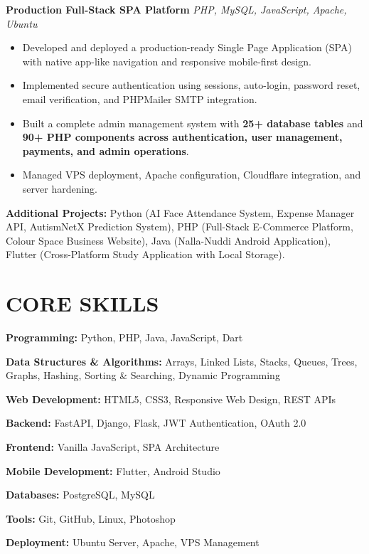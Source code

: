 \documentclass[10pt,a4paper]{article}
\begin{document}
\textbf{Production Full-Stack SPA Platform}
\hfill \textit{PHP, MySQL, JavaScript, Apache, Ubuntu}

\begin{itemize}
\item Developed and deployed a production-ready Single Page Application (SPA) with native app-like navigation and responsive mobile-first design.
\item Implemented secure authentication using sessions, auto-login, password reset, email verification, and PHPMailer SMTP integration.
\item Built a complete admin management system with \textbf{25+ database tables} and \textbf{90+ PHP components across authentication, user management, payments, and admin operations}.
\item Managed VPS deployment, Apache configuration, Cloudflare integration, and server hardening.
\end{itemize}

\textbf{Additional Projects:} Python (AI Face Attendance System, Expense Manager API, AutismNetX Prediction System), PHP (Full-Stack E-Commerce Platform, Colour Space Business Website), Java (Nalla-Nuddi Android Application), Flutter (Cross-Platform Study Application with Local Storage).



\section*{CORE SKILLS}

\textbf{Programming:} Python, PHP, Java, JavaScript, Dart

\textbf{Data Structures \& Algorithms:} Arrays, Linked Lists, Stacks, Queues, Trees, Graphs, Hashing, Sorting \& Searching, Dynamic Programming

\textbf{Web Development:} HTML5, CSS3, Responsive Web Design, REST APIs

\textbf{Backend:} FastAPI, Django, Flask, JWT Authentication, OAuth 2.0

\textbf{Frontend:} Vanilla JavaScript, SPA Architecture

\textbf{Mobile Development:} Flutter, Android Studio

\textbf{Databases:} PostgreSQL, MySQL

\textbf{Tools:} Git, GitHub, Linux, Photoshop

\textbf{Deployment:} Ubuntu Server, Apache, VPS Management
\end{document}
